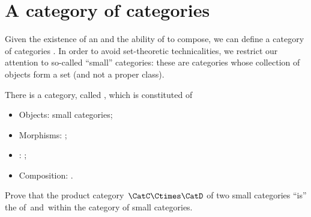 \section{A category of categories}

Given the existence of an  and the ability of  to compose, we can define a category of categories \Category.
In order to avoid set-theoretic technicalities, we restrict our attention to so-called ``small'' categories: these are categories whose collection of objects form a set (and not a proper class).

\begin{ctdefinition}
    \label{def:Category}
    There is a category, called \Category, which is constituted of
    \begin{itemize}
        \item Objects: small categories;
        \item Morphisms: ;
        \item {}: ;
        \item Composition: .
    \end{itemize}
\end{ctdefinition}
\vfill
\begin{gradedexercise}
    Prove that the product category~$\CatC \Ctimes \CatD$ of two small categories ``is'' the  of~\CatC and~\CatD within the category of small categories.
\end{gradedexercise}
